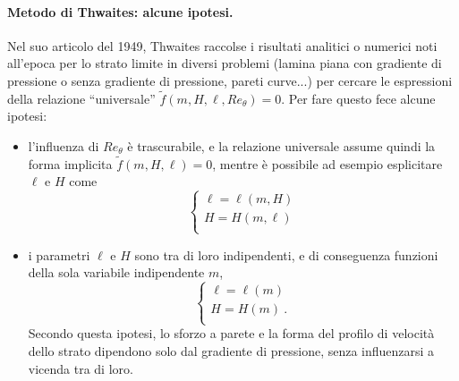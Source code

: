 \paragraph{Metodo di Thwaites: alcune ipotesi.}
Nel suo articolo del 1949, Thwaites raccolse i risultati analitici o numerici noti all'epoca per lo strato limite in diversi problemi (lamina piana con gradiente di pressione o senza gradiente di pressione, pareti curve...) per cercare le espressioni della relazione ``universale'' $\tilde{f}(m, H, \ell, Re_{\theta}) = 0$. Per fare questo fece alcune ipotesi:
\begin{itemize}
 \item l'influenza di $Re_{\theta}$ è trascurabile, e la relazione universale assume quindi la forma implicita $\tilde{f}(m,H,\ell) = 0$, mentre è possibile ad esempio esplicitare $\ell$ e $H$ come
 \begin{equation}
  \begin{cases}
   \ell = \ell(m, H) \\
   H    = H(m, \ell) \\
  \end{cases}
 \end{equation}
\item i parametri $\ell$ e $H$ sono tra di loro indipendenti, e di conseguenza funzioni della sola variabile indipendente $m$,
 \begin{equation}
  \begin{cases}
   \ell = \ell(m) \\
   H    =    H(m) \ . \\
  \end{cases}
 \end{equation}
 Secondo questa ipotesi, lo sforzo a parete e la forma del profilo di velocità dello strato dipendono solo dal gradiente di pressione, senza influenzarsi a vicenda tra di loro.
\end{itemize}

